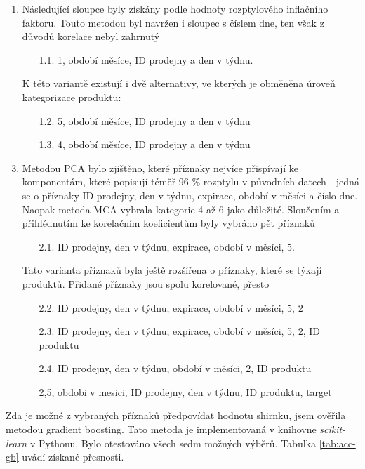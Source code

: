 \begin{enumerate}
    \item Následující sloupce byly získány podle hodnoty rozptylového inflačního faktoru. Touto metodou byl navržen i sloupec s číslem dne, ten však z důvodů korelace nebyl zahrnutý
    \begin{enumerate}
        \item[1.1.] 1, období měsíce, ID prodejny a den v týdnu.
    \end{enumerate}
    
    \item[] K této variantě existují i dvě alternativy, ve kterých je obměněna úroveň kategorizace produktu:     
    \begin{enumerate}
    \item[1.2.] 5, období měsíce, ID prodejny a den v týdnu
    \item[1.3.] 4, období měsíce, ID prodejny a den v týdnu
    \end{enumerate}
    \item Metodou PCA bylo zjištěno, které příznaky nejvíce přispívají ke komponentám, které popisují téměř 96 \% rozptylu v původních datech - jedná se o příznaky ID prodejny, den v týdnu, expirace, období v měsíci a číslo dne. Naopak metoda MCA vybrala kategorie 4 až 6 jako důležité. Sloučením a přihlédnutím ke korelačním koeficientům byly vybráno pět příznaků
    \begin{enumerate}
        \item[2.1.] ID prodejny, den v týdnu, expirace, období v měsíci, 5.
    \end{enumerate}
    \item[] Tato varianta příznaků byla ještě rozšířena o příznaky, které se týkají produktů. Přidané příznaky jsou spolu korelované, přesto 
    \begin{enumerate}
    \item[2.2.] ID prodejny, den v týdnu, expirace, období v měsíci, 5, 2
    \item[2.3.] ID prodejny, den v týdnu, expirace, období v měsíci, 5, 2, ID produktu
    \item[2.4.] ID prodejny, den v týdnu, období v měsíci, 2, ID produktu
    \item[] 2,5, obdobi v mesici,  ID prodejny, den v týdnu, ID produktu, target
    \end{enumerate}
\end{enumerate}

Zda je možné z vybraných příznaků předpovídat hodnotu shirnku, jsem ověřila metodou gradient boosting. Tato metoda je implementovaná v knihovne \emph{scikit-learn} v Pythonu.
Bylo otestováno všech sedm možných výběrů. 
Tabulka \ref*{tab:acc-gb} uvádí získané přesnosti.

